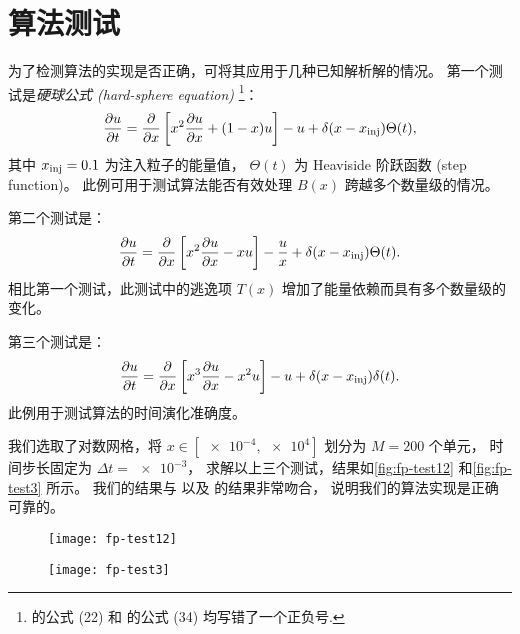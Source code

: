 \section{算法测试}

为了检测算法的实现是否正确，可将其应用于几种已知解析解的情况\cite{park1996,donnert2014}。
第一个测试是\emph{硬球公式 (hard-sphere equation)}%
\footnote{ 的公式 (22) 和  的公式 (34)
均写错了一个正负号.}：
\begin{equation}
  \label{eq:fp-test1}
  \frac{\partial u}{\partial t} = \frac{\partial }{\partial x} \left[ x^2 \frac{\partial u}{\partial x} + (1-x) u \right]
    - u + \delta(x-x_{\mathrm{inj}}) \Theta(t) ,
\end{equation}
其中 $x_{\mathrm{inj}} = 0.1$ 为注入粒子的能量值，
$\Theta(t)$ 为 Heaviside 阶跃函数 (step function)。
此例可用于测试算法能否有效处理 $B(x)$ 跨越多个数量级的情况。

第二个测试是：
\begin{equation}
  \label{eq:fp-test2}
  \frac{\partial u}{\partial t} = \frac{\partial }{\partial x} \left[ x^2 \frac{\partial u}{\partial x} - x u \right]
    - \frac{u}{x} + \delta(x-x_{\mathrm{inj}}) \Theta(t) .
\end{equation}
相比第一个测试，此测试中的逃逸项 $T(x)$ 增加了能量依赖而具有多个数量级的变化。

第三个测试是：
\begin{equation}
  \label{eq:fp-test3}
  \frac{\partial u}{\partial t} = \frac{\partial }{\partial x} \left[ x^3 \frac{\partial u}{\partial x} - x^2 u \right]
    - u + \delta(x-x_{\mathrm{inj}}) \delta(t) .
\end{equation}
此例用于测试算法的时间演化准确度。

我们选取了对数网格，将 $x \in [\num{e-4}, \num{e4}]$ 划分为 $M=200$ 个单元，
时间步长固定为 $\Delta t = \num{e-3}$，
求解以上三个测试，结果如\autoref{fig:fp-test12} 和\autoref{fig:fp-test3} 所示。
我们的结果与  以及  的结果非常吻合，
说明我们的算法实现是正确可靠的。

\begin{figure}[htp]
  \centering
  \texttt{[image: fp-test12]}
  \label{fig:fp-test12}
\end{figure}

\begin{figure}[htp]
  \centering
  \texttt{[image: fp-test3]}
  \label{fig:fp-test3}
\end{figure}


